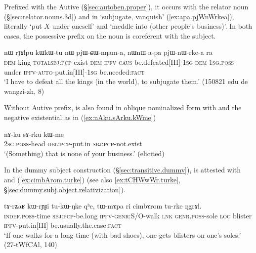 Prefixed with the Autive  (§\ref{sec:autoben.proper}), it occurs with the relator noun  (§\ref{sec:relator.nouns.3d}) and  in  `subjugate, vanquish' (\ref{ex:apa.pjWnWrkea}), literally `put $X$ under oneself' and  `meddle into (other people's business)'. In both cases, the possessive prefix on the noun is coreferent with the subject.

\begin{exe}
\ex \label{ex:apa.pjWnWrkea}
\gll nɯ rɟɤlpu kɯ\redp{}kɯ-tu nɯ pjɯ-ɕɯ-nŋam-a, nɯnɯ a-pa pjɯ-nɯ-rke-a ra \\
\textsc{dem} king \textsc{total}\redp{}\textsc{sbj}:\textsc{pcp}-exist \textsc{dem} \textsc{ipfv}-\textsc{caus}-be.defeated[III]-\textsc{1sg} \textsc{dem} \textsc{1sg}.\textsc{poss}-under \textsc{ipfv}-\textsc{auto}-put.in[III]-\textsc{1sg} be.needed:\textsc{fact} \\
\glt `I have to defeat all the kings (in the world), to subjugate them.' (150821 edu de wangzi-zh, 8)
\end{exe}


Without Autive prefix,  is also found in oblique nominalized form with  and the negative existential  as in (\ref{ex:nAku.sArku.kWme})

\begin{exe}
\ex \label{ex:nAku.sArku.kWme}
\gll nɤ-ku sɤ-rku kɯ-me \\
\textsc{2sg}.\textsc{poss}-head \textsc{obl}:\textsc{pcp}-put.in \textsc{sbj}:\textsc{pcp}-not.exist  \\
\glt `(Something) that is none of your business.' (elicited)
\end{exe}

In the dummy subject construction (§\ref{sec:transitive.dummy}),  is attested with  and  (\ref{ex:cimbArom.turke}) (see also \ref{ex:tCHWwWr.turke}, §\ref{sec:dummy.subj.object.relativization}).

\begin{exe}
\ex \label{ex:cimbArom.turke}
\gll tɤ-rʑaʁ kɯ-rɲɟi tu-kɯ-ŋke qʰe, tɯ-mɤpa ri cimbɤrom tu-rke ŋgrɤl. \\
\textsc{indef}.\textsc{poss}-time \textsc{sbj}:\textsc{pcp}-be.long \textsc{ipfv}-\textsc{genr}:S/O-walk \textsc{lnk} \textsc{genr}.\textsc{poss}-sole \textsc{loc} blister \textsc{ipfv}-put.in[III] be.usually.the.case:\textsc{fact} \\
\glt `If one walks for a long time (with bad shoes), one gets blisters on one's soles.' (27-tWfCAl, 140)
\end{exe}
 
